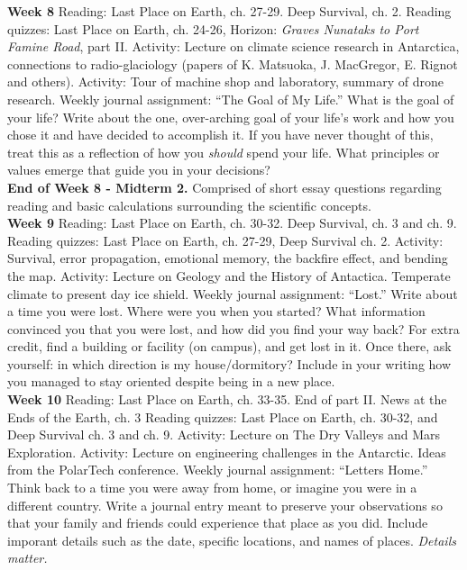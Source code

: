 \documentclass[10pt]{article}
\begin{document}
\begin{outline}[enumerate]
\1 \textbf{Week 8}
\2 Reading: Last Place on Earth, ch. 27-29.  Deep Survival, ch. 2.
\2 Reading quizzes: Last Place on Earth, ch. 24-26, Horizon: \textit{Graves Nunataks to Port Famine Road}, part II.
\2 Activity: Lecture on climate science research in Antarctica, connections to radio-glaciology (papers of K. Matsuoka, J. MacGregor, E. Rignot and others).
\2 Activity: Tour of machine shop and laboratory, summary of drone research.
\2 Weekly journal assignment: ``The Goal of My Life.'' What is the goal of your life?  Write about the one, over-arching goal of your life's work and how you chose it and have decided to accomplish it.  If you have never thought of this, treat this as a reflection of how you \textit{should} spend your life.  What principles or values emerge that guide you in your decisions? \\
\1 \textbf{End of Week 8 - Midterm 2.} Comprised of short essay questions regarding reading and basic calculations surrounding the scientific concepts. \\
\1 \textbf{Week 9}
\2 Reading: Last Place on Earth, ch. 30-32. Deep Survival, ch. 3 and ch. 9.
\2 Reading quizzes: Last Place on Earth, ch. 27-29, Deep Survival ch. 2.
\2 Activity: Survival, error propagation, emotional memory, the backfire effect, and bending the map.
\2 Activity: Lecture on Geology and the History of Antactica.  Temperate climate to present day ice shield.
\2 Weekly journal assignment: ``Lost.'' Write about a time you were lost.  Where were you when you started?  What information convinced you that you were lost, and how did you find your way back?  For extra credit, find a building or facility (on campus), and get lost in it.  Once there, ask yourself: in which direction is my house/dormitory?  Include in your writing how you managed to stay oriented despite being in a new place. \\
\1 \textbf{Week 10}
\2 Reading: Last Place on Earth, ch. 33-35. End of part II.  News at the Ends of the Earth, ch. 3
\2 Reading quizzes: Last Place on Earth, ch. 30-32, and Deep Survival ch. 3 and ch. 9.
\2 Activity: Lecture on The Dry Valleys and Mars Exploration.
\2 Activity: Lecture on engineering challenges in the Antarctic.  Ideas from the PolarTech conference.
\2 Weekly journal assignment: ``Letters Home.'' Think back to a time you were away from home, or imagine you were in a different country.  Write a journal entry meant to preserve your observations so that your family and friends could experience that place as you did.  Include imporant details such as the date, specific locations, and names of places.  \textit{Details matter.} \\

\end{outline}
\end{document}
